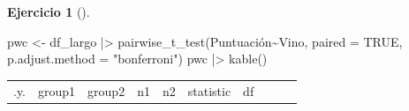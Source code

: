 \documentclass[
  a4paper,
]{scrreport}
\newenvironment{Shaded}{\begin{snugshade}}{\end{snugshade}}
\newcommand{\AttributeTok}[1]{\textcolor[rgb]{0.40,0.45,0.13}{#1}}
\newcommand{\ConstantTok}[1]{\textcolor[rgb]{0.56,0.35,0.01}{#1}}
\newcommand{\FunctionTok}[1]{\textcolor[rgb]{0.28,0.35,0.67}{#1}}
\newcommand{\NormalTok}[1]{\textcolor[rgb]{0.00,0.23,0.31}{#1}}
\newcommand{\OtherTok}[1]{\textcolor[rgb]{0.00,0.23,0.31}{#1}}
\newcommand{\SpecialCharTok}[1]{\textcolor[rgb]{0.37,0.37,0.37}{#1}}
\newcommand{\StringTok}[1]{\textcolor[rgb]{0.13,0.47,0.30}{#1}}
\theoremstyle{definition}
\newtheorem{exercise}{Ejercicio}[chapter]
\theoremstyle{remark}
\begin{document}
\begin{exercise}[]
\begin{enumerate}
\begin{tcolorbox}
\begin{Shaded}
\begin{Highlighting}[]
\NormalTok{pwc }\OtherTok{\textless{}{-}}\NormalTok{ df\_largo }\SpecialCharTok{|\textgreater{}} 
    \FunctionTok{pairwise\_t\_test}\NormalTok{(Puntuación}\SpecialCharTok{\textasciitilde{}}\NormalTok{Vino, }\AttributeTok{paired =} \ConstantTok{TRUE}\NormalTok{, }\AttributeTok{p.adjust.method =} \StringTok{"bonferroni"}\NormalTok{)}
\NormalTok{pwc }\SpecialCharTok{|\textgreater{}} 
    \FunctionTok{kable}\NormalTok{()}
\end{Highlighting}
\end{Shaded}

  \begin{longtable}[]{@{}
    >{\raggedright\arraybackslash}p{}
    >{\raggedright\arraybackslash}p{}
    >{\raggedright\arraybackslash}p{}
    >{\raggedleft\arraybackslash}p{}
    >{\raggedleft\arraybackslash}p{}
    >{\raggedleft\arraybackslash}p{}
    >{\raggedleft\arraybackslash}p{}
    >{\raggedleft\arraybackslash}p{}
    >{\raggedleft\arraybackslash}p{}
    >{\raggedright\arraybackslash}p{}@{}}
  \toprule\noalign{}
  \begin{minipage}[b]{\linewidth}\raggedright
  .y.
  \end{minipage} & \begin{minipage}[b]{\linewidth}\raggedright
  group1
  \end{minipage} & \begin{minipage}[b]{\linewidth}\raggedright
  group2
  \end{minipage} & \begin{minipage}[b]{\linewidth}\raggedleft
  n1
  \end{minipage} & \begin{minipage}[b]{\linewidth}\raggedleft
  n2
  \end{minipage} & \begin{minipage}[b]{\linewidth}\raggedleft
  statistic
  \end{minipage} & \begin{minipage}[b]{\linewidth}\raggedleft
  df
  \end{minipage} & \begin{minipage}[b]{\linewidth}\raggedleft

\end{minipage}
\end{longtable}
\end{tcolorbox}
\end{enumerate}
\end{exercise}
\end{document}
